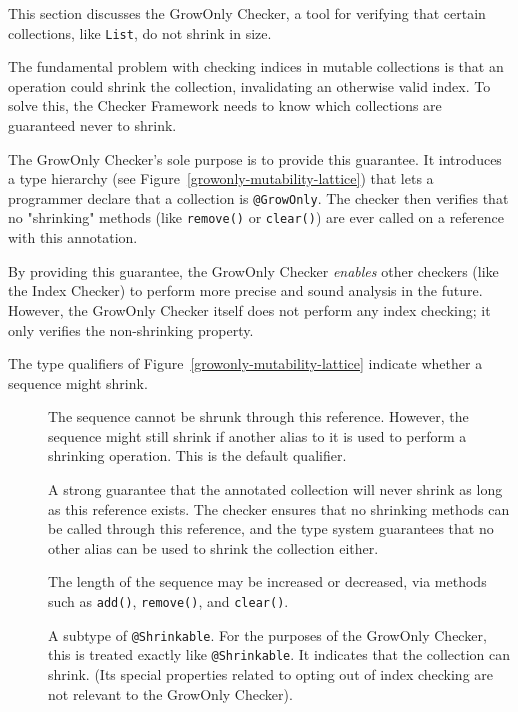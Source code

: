 This section discusses the GrowOnly Checker, a tool for verifying that certain collections, like \texttt{List}, do not shrink in size.

The fundamental problem with checking indices in mutable collections is that an operation could shrink the collection, invalidating an otherwise valid index. To solve this, the Checker Framework needs to know which collections are guaranteed never to shrink.

The GrowOnly Checker's sole purpose is to provide this guarantee. It introduces a type hierarchy (see Figure~\ref{growonly-mutability-lattice}) that lets a programmer declare that a collection is \texttt{@GrowOnly}. The checker then verifies that no "shrinking" methods (like \texttt{remove()} or \texttt{clear()}) are ever called on a reference with this annotation.

By providing this guarantee, the GrowOnly Checker \emph{enables} other checkers (like the Index Checker) to perform more precise and sound analysis in the future. However, the GrowOnly Checker itself does not perform any index checking; it only verifies the non-shrinking property.

The type qualifiers of Figure~\ref{growonly-mutability-lattice} indicate whether a sequence might shrink.
\begin{description}
\item[]
  The sequence cannot be shrunk through this reference. However, the sequence might still shrink if another alias to it is used to perform a shrinking operation. This is the default qualifier.

\item[]
  A strong guarantee that the annotated collection will never shrink as long as this reference exists. The checker ensures that no shrinking methods can be called through this reference, and the type system guarantees that no other alias can be used to shrink the collection either.

\item[]
  The length of the sequence may be increased or decreased, via methods such as \texttt{add()}, \texttt{remove()}, and \texttt{clear()}.

\item[]
  A subtype of \texttt{@Shrinkable}. For the purposes of the GrowOnly Checker, this is treated exactly like \texttt{@Shrinkable}. It indicates that the collection can shrink. (Its special properties related to opting out of index checking are not relevant to the GrowOnly Checker).
\end{description}

